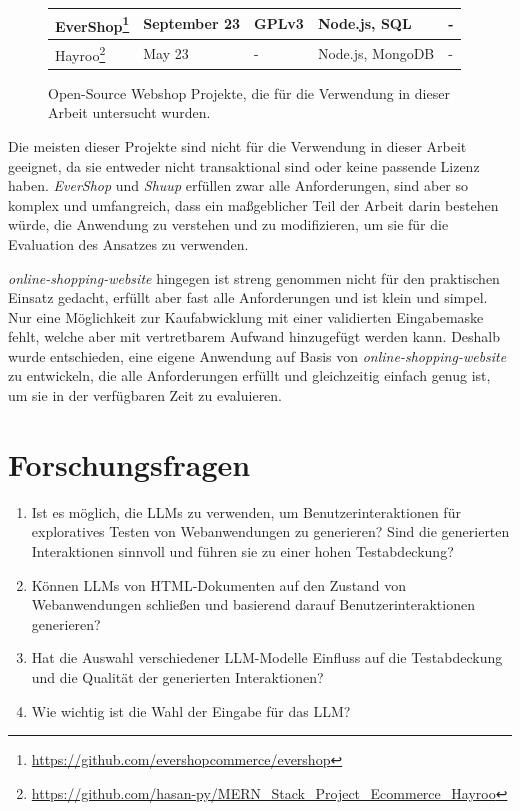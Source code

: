 \begin{figure}[h]
\begin{minipage}[c]{\textwidth}
{\begin{tabular}{ | l | l | l | l | l |}
                EverShop\footnote{\url{https://github.com/evershopcommerce/evershop}} & September 23 & GPLv3 & Node.js, SQL & - \\ \hline
                Hayroo\footnote{\url{https://github.com/hasan-py/MERN_Stack_Project_Ecommerce_Hayroo}} & May 23 & - & Node.js, MongoDB & - \\ \hline
            \end{tabular}
        }
    \end{minipage}
    \caption{Open-Source Webshop Projekte, die für die Verwendung in dieser Arbeit untersucht wurden.}
    \label{tab:webshop_projects}
\end{figure}

Die meisten dieser Projekte sind nicht für die Verwendung in dieser Arbeit geeignet, da sie entweder nicht transaktional sind oder keine passende Lizenz haben.
\textit{EverShop} und \textit{Shuup} erfüllen zwar alle Anforderungen, sind aber so komplex und umfangreich, dass ein maßgeblicher Teil der Arbeit darin bestehen würde, die Anwendung zu verstehen und zu modifizieren, um sie für die Evaluation des Ansatzes zu verwenden.

\textit{online-shopping-website} hingegen ist streng genommen nicht für den praktischen Einsatz gedacht, erfüllt aber fast alle Anforderungen und ist klein und simpel.
Nur eine Möglichkeit zur Kaufabwicklung mit einer validierten Eingabemaske fehlt, welche aber mit vertretbarem Aufwand hinzugefügt werden kann.
Deshalb wurde entschieden, eine eigene Anwendung auf Basis von \textit{online-shopping-website} zu entwickeln, die alle Anforderungen erfüllt und gleichzeitig einfach genug ist, um sie in der verfügbaren Zeit zu evaluieren.

\section{Forschungsfragen}

\begin{enumerate}
    \item Ist es möglich, die LLMs zu verwenden, um Benutzerinteraktionen für exploratives Testen von Webanwendungen zu generieren? Sind die generierten Interaktionen sinnvoll und führen sie zu einer hohen Testabdeckung?
    \item Können LLMs von HTML-Dokumenten auf den Zustand von Webanwendungen schließen und basierend darauf Benutzerinteraktionen generieren?
    \item Hat die Auswahl verschiedener LLM-Modelle Einfluss auf die Testabdeckung und die Qualität der generierten Interaktionen?
    \item Wie wichtig ist die Wahl der Eingabe für das LLM?
\end{enumerate}

